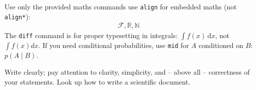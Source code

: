 \documentclass[12pt]{article}
\newcommand{\Rbb}{\mathbb{R}}
\newcommand{\Nbb}{\mathbb{N}}
\newcommand{\Fcal}{\mathcal{F}}
\newcommand{\diff}{\,\text{d}}
\begin{document}
Use only the provided maths commands use \texttt{align} for embedded maths (not \texttt{align*}):
\begin{align}
    \Fcal, \Rbb, \Nbb
\end{align}
The \texttt{diff} command is for proper typesetting in integrals: $\int f(x) \diff x$, not $\int f(x) dx$.
If you need conditional probabilities, use \texttt{mid} for $A$ conditioned on $B$: $p(A \mid B)$.

Write clearly; pay attention to clarity, simplicity, and -- above all -- correctness of your statements. Look up how to write a scientific document.


\end{document}
